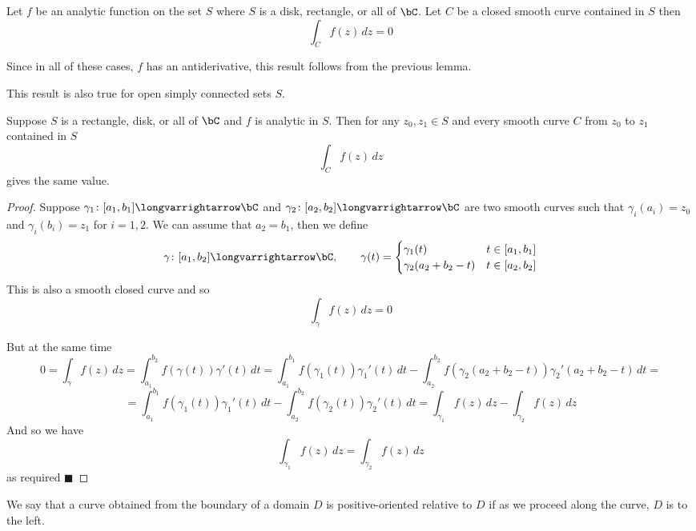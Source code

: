 \documentclass[10pt]{article}
\let\longto=\longvarrightarrow
\def\qed{\hskip1cm\hbox{}\hfill$\blacksquare$}
\begin{document}
\begin{thrm*}

    Let $f$ be an analytic function on the set $S$ where $S$ is a disk, rectangle, or all of $\bC$.
    Let $C$ be a closed smooth curve contained in $S$ then
    \[ \int_C f(z)\,dz = 0 \]

\end{thrm*}

Since in all of these cases, $f$ has an antiderivative, this result follows from the previous lemma.

This result is also true for open simply connected sets $S$.

\begin{thrm*}

    Suppose $S$ is a rectangle, disk, or all of $\bC$ and $f$ is analytic in $S$.
    Then for any $z_0,z_1\in S$ and every smooth curve $C$ from $z_0$ to $z_1$ contained in $S$
    \[ \int_C f(z)\,dz \]
    gives the same value.

\end{thrm*}

\begin{proof}

    Suppose $\gamma_1\colon[a_1,b_1]\longto\bC$ and $\gamma_2\colon[a_2,b_2]\longto\bC$ are two smooth curves such that $\gamma_i(a_i)=z_0$ and $\gamma_i(b_i)=z_1$ for $i=1,2$.
    We can assume that $a_2=b_1$, then we define
    \[ \gamma\colon[a_1,b_2]\longto\bC,\qquad \gamma(t) = \begin{cases} \gamma_1(t) & t\in[a_1,b_1] \\ \gamma_2(a_2+b_2-t) & t\in[a_2,b_2] \end{cases} \]
    This is also a smooth closed curve and so
    \[ \int_\gamma f(z)\,dz = 0 \]

    But at the same time
    \[ 0 = \int_\gamma f(z)\,dz = \int_{a_1}^{b_2} f(\gamma(t))\gamma'(t)\,dt = \int_{a_1}^{b_1} f(\gamma_1(t))\gamma_1'(t)\,dt - \int_{a_2}^{b_2} f(\gamma_2(a_2+b_2-t))\gamma_2'(a_2+b_2-t)\,dt = \]
    \[ = \int_{a_1}^{b_1} f(\gamma_1(t))\gamma_1'(t)\,dt - \int_{a_2}^{b_2} f(\gamma_2(t))\gamma_2'(t)\,dt = \int_{\gamma_1} f(z)\,dz - \int_{\gamma_2} f(z)\,dz \]
    And so we have
    \[ \int_{\gamma_1} f(z)\,dz = \int_{\gamma_2} f(z)\,dz \]
    as required
    \qed

\end{proof}

We say that a curve obtained from the boundary of a domain $D$ is positive-oriented relative to $D$ if as we proceed along the curve, $D$ is to the left.
\end{document}
